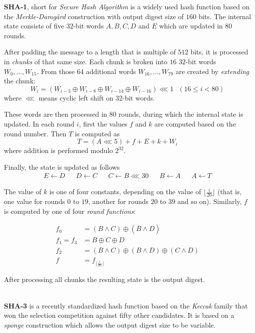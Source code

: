 \textbf{SHA-1}, short for \emph{Secure Hash Algorithm} is a widely used hash function based on the \emph{Merkle-Damg\aa rd} construction \cite{merkle1979secrecy} with output digest size of $160$ bits.
The internal state consists of five $32$-bit words $A, B, C, D$ and $E$ which are updated in $80$ rounds.

After padding the message to a length that is multiple of $512$ bits, it is processed in \emph{chunks} of that same size.
Each chunk is broken into $16$ $32$-bit words $W_0, \dots, W_{15}$.
From those $64$ additional words $W_{16}, \dots, W_{79}$ are created by \emph{extending} the chunk:
\[
W_i = (W_{i-3} \oplus W_{i-8} \oplus W_{i-14} \oplus W_{i-16}) \lll 1 ~~~ (16 \le i < 80)
\]
where $\lll$ means cyclic left shift on $32$-bit words.

These words are then processed in $80$ rounds, during which the internal state is updated.
In each round $i$, first the values $f$ and $k$ are computed based on the round number.
Then $T$ is computed as
\[
T = (A \lll 5) + f + E + k + W_i
\]
where addition is performed modulo $2^{32}$.

Finally, the state is updated as follows
\begin{align*}
E \gets D& &D \gets C& &C \gets B \lll 30& &B \gets A& &A \gets T
\end{align*}

The value of $k$ is one of four constants, depending on the value of $\lfloor \frac{i}{20} \rfloor$ (that is, one value for rounds $0$ to $19$, another for rounds $20$ to $39$ and so on).
Similarly, $f$ is computed by one of four \emph{round functions}:

\begin{align*}
f_0 &= (B \land C) \oplus (\overline{B} \land D) \\
f_1 = f_3 &= B \oplus C \oplus D \\
f_2 &= (B \land C) \oplus (B \land D) \oplus (C \land D)\\
f &= f_{\lfloor \frac{i}{20} \rfloor}
\end{align*}

After processing all chunks the resulting state is the output digest.

~\\

\textbf{SHA-3} is a recently standardized hash function based on the \emph{Keccak} family that won the selection competition against fifty other candidates.
It is based on a \emph{sponge} construction which allows the output digest size to be variable.

